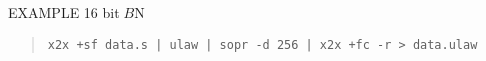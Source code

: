 
\begin{qsection}{EXAMPLE}
16 bit$B$N%
\begin{quote}
  \verb!x2x +sf data.s | ulaw | sopr -d 256 | x2x +fc -r > data.ulaw!
\end{quote}
\end{qsection}

